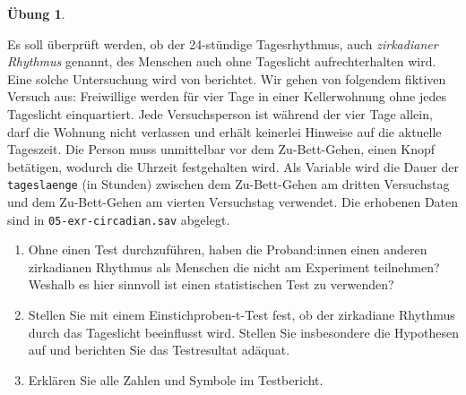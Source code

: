 \documentclass[
]{book}
\providecommand{\tightlist}{%
  \setlength{\itemsep}{0pt}\setlength{\parskip}{0pt}}
\theoremstyle{definition}
\theoremstyle{definition}
\theoremstyle{definition}
\newtheorem{exercise}{Übung}[chapter]
\theoremstyle{definition}
\theoremstyle{remark}
\begin{document}
\begin{exercise}
\protect\hypertarget{exr:circadian}{}\label{exr:circadian}\leavevmode

Es soll überprüft werden, ob der 24-stündige Tagesrhythmus, auch \emph{zirkadianer Rhythmus} genannt, des Menschen auch ohne Tageslicht aufrechterhalten wird. Eine solche Untersuchung wird von \citet{czeisler1999} berichtet. Wir gehen von folgendem fiktiven Versuch aus: Freiwillige werden für vier Tage in einer Kellerwohnung ohne jedes Tageslicht einquartiert. Jede Versuchsperson ist während der vier Tage allein, darf die Wohnung nicht verlassen und erhält keinerlei Hinweise auf die aktuelle Tageszeit. Die Person muss unmittelbar vor dem Zu-Bett-Gehen, einen Knopf betätigen, wodurch die Uhrzeit festgehalten wird. Als Variable wird die Dauer der \texttt{tageslaenge} (in Stunden) zwischen dem Zu-Bett-Gehen am dritten Versuchstag und dem Zu-Bett-Gehen am vierten Versuchstag verwendet. Die erhobenen Daten sind in \texttt{05-exr-circadian.sav} abgelegt.

\begin{enumerate}
\def\labelenumi{\alph{enumi})}
\tightlist
\item
  Ohne einen Test durchzuführen, haben die Proband:innen einen anderen zirkadianen Rhythmus als Menschen die nicht am Experiment teilnehmen? Weshalb es hier sinnvoll ist einen statistischen Test zu verwenden?
\item
  Stellen Sie mit einem Einstichproben-t-Test fest, ob der zirkadiane Rhythmus durch das Tageslicht beeinflusst wird. Stellen Sie insbesondere die Hypothesen auf und berichten Sie das Testresultat adäquat.
\item
  Erklären Sie alle Zahlen und Symbole im Testbericht.
\end{enumerate}

\end{exercise}
\end{document}
